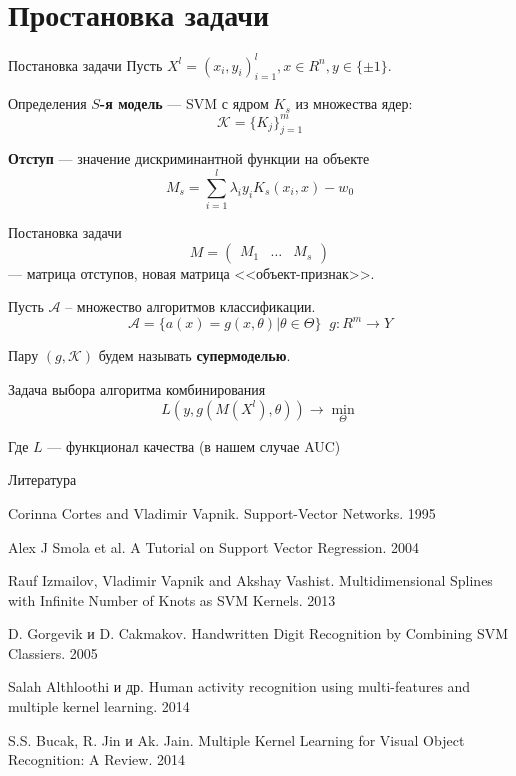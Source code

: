 \documentclass{beamer}
\begin{document}
\section{Простановка задачи}
\begin{frame}{Постановка задачи}
Пусть $X^l = (x_i, y_i)_{i=1}^l, x \in R^n, y \in \{\pm 1\}$.
     \begin{block}{Определения}
        \textbf{$S$-я модель} --- SVM с ядром $K_s$ из множества ядер:
    	$$
    	\mathcal{K} = \{K_j\}_{j=1}^m
    	$$
    	
    	\textbf{Отступ} --- значение дискриминантной функции на объекте
    	$$
    	M_s = \sum_{i=1}^l \lambda_i y_i K_s(x_i, x) - w_0
    	$$
     \end{block}
\end{frame}
\begin{frame}{Постановка задачи}
	$$
	M = \begin{pmatrix}
		M_1 & \ldots & M_s
	\end{pmatrix}
	$$
	--- матрица отступов, новая матрица <<объект-признак>>.
	
	Пусть $\mathcal{A}$ -- множество алгоритмов классификации.
	$$
	\mathcal{A} = \{a(x) = g(x, \theta) | \theta \in \Theta\}
	\;\; g: R^m \to Y
	$$
	\begin{block}{}
		Пару $(g, \mathcal{K})$ будем называть \textbf{супермоделью}.
	\end{block}
	\begin{block}{Задача выбора алгоритма комбинирования}
		$$
		L(y, g(M(X^l), \theta)) \to \min_{\Theta} 
		$$
	\end{block}
	Где $L$ --- функционал качества (в нашем случае AUC)
\end{frame}
\begin{frame}{Литература}
    \begin{enumerate}
        \footnotesize {
        \item
            Corinna Cortes and Vladimir Vapnik. Support-Vector Networks. 1995
        \item
        Alex J Smola et al. A Tutorial on Support Vector Regression. 2004
        \item
        Rauf Izmailov, Vladimir Vapnik and Akshay Vashist. Multidimensional Splines with Infinite Number of Knots as SVM Kernels. 2013
            }
        \item
        D. Gorgevik и D. Cakmakov. Handwritten Digit Recognition by Combining SVM Classiers. 2005
        \item 
        Salah Althloothi и др. Human activity recognition using multi-features and multiple kernel learning. 2014
        \item
        S.S. Bucak, R. Jin и Ak. Jain. Multiple Kernel Learning for Visual Object Recognition: A Review. 2014
     \end{enumerate}
\end{frame}
\end{document}
